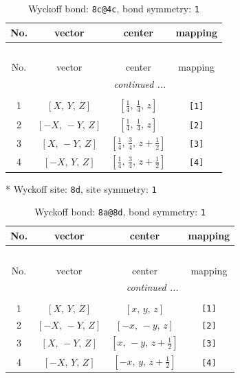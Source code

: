\documentclass[fleqn,8pt]{jsarticle}
\begin{document}
\begin{longtable}{cccc}
\caption{Wyckoff bond: {\tt 8c@4c}, bond symmetry: {\tt 1}}
 \\
 \hline \hline
No. & vector & center & mapping \\ \hline \endfirsthead

\multicolumn{3}{l}{\tablename\ \thetable{}} \\
 \hline \hline
No. & vector & center & mapping \\ \hline \endhead

 \hline \hline
\multicolumn{3}{r}{\footnotesize\it continued ...} \\ \endfoot

 \hline \hline
\multicolumn{3}{r}{} \\ \endlastfoot

1 & $\left[ X,\, Y,\, Z \right]$ & $\left[ \frac{1}{4},\, \frac{1}{4},\, z \right]$ & {\tt [1]} \\ \hline
2 & $\left[ - X,\, - Y,\, Z \right]$ & $\left[ \frac{1}{4},\, \frac{1}{4},\, z \right]$ & {\tt [2]} \\ \hline
3 & $\left[ X,\, - Y,\, Z \right]$ & $\left[ \frac{1}{4},\, \frac{3}{4},\, z + \frac{1}{2} \right]$ & {\tt [3]} \\ \hline
4 & $\left[ - X,\, Y,\, Z \right]$ & $\left[ \frac{1}{4},\, \frac{3}{4},\, z + \frac{1}{2} \right]$ & {\tt [4]} \\
\end{longtable}
* Wyckoff site: {\tt 8d}, site symmetry: {\tt 1}
\renewcommand{\arraystretch}{1.2}
\begin{longtable}{cccc}
\caption{Wyckoff bond: {\tt 8a@8d}, bond symmetry: {\tt 1}}
 \\
 \hline \hline
No. & vector & center & mapping \\ \hline \endfirsthead

\multicolumn{3}{l}{\tablename\ \thetable{}} \\
 \hline \hline
No. & vector & center & mapping \\ \hline \endhead

 \hline \hline
\multicolumn{3}{r}{\footnotesize\it continued ...} \\ \endfoot

 \hline \hline
\multicolumn{3}{r}{} \\ \endlastfoot

1 & $\left[ X,\, Y,\, Z \right]$ & $\left[ x,\, y,\, z \right]$ & {\tt [1]} \\ \hline
2 & $\left[ - X,\, - Y,\, Z \right]$ & $\left[ - x,\, - y,\, z \right]$ & {\tt [2]} \\ \hline
3 & $\left[ X,\, - Y,\, Z \right]$ & $\left[ x,\, - y,\, z + \frac{1}{2} \right]$ & {\tt [3]} \\ \hline
4 & $\left[ - X,\, Y,\, Z \right]$ & $\left[ - x,\, y,\, z + \frac{1}{2} \right]$ & {\tt [4]} \\
\end{longtable}
\end{document}
